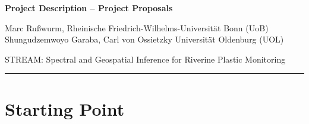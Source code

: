 \documentclass{scrartcl}
\newcommand{\applicants}{Marc Rußwurm, Rheinische Friedrich-Wilhelms-Universität Bonn
 (UoB) \\ Shungudzemwoyo Garaba, Carl von Ossietzky Universität Oldenburg (UOL)}
\newcommand{\project}{STREAM: Spectral and Geospatial Inference for Riverine Plastic Monitoring}
\begin{document}
\pagestyle{empty}
\setcounter{page}{1}

% 

\cleardoublepage
\pagestyle{plain}


{\raggedright{} \normalsize \bfseries 
	Project Description -- Project Proposals \newline \par
	\applicants{} \newline \par
	\project{} \par
	\rule{\textwidth}{0.5pt} \par
}


\section{Starting Point}
\label{sec:work-report}
\end{document}

